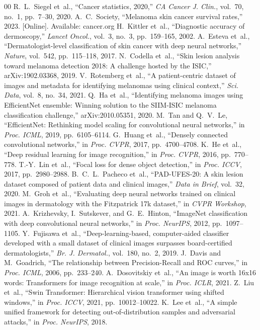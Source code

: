\documentclass[conference]{IEEEtran}
\begin{document}
\begin{thebibliography}{00}
 R.~L.~Siegel et~al., ``Cancer statistics, 2020,'' \textit{CA Cancer J. Clin.}, vol.~70, no.~1, pp.~7--30, 2020.
 A.~C.~Society, ``Melanoma skin cancer survival rates,'' 2023. [Online]. Available: cancer.org
 H.~Kittler et~al., ``Diagnostic accuracy of dermoscopy,'' \textit{Lancet Oncol.}, vol.~3, no.~3, pp.~159--165, 2002.
 A.~Esteva et~al., ``Dermatologist-level classification of skin cancer with deep neural networks,'' \textit{Nature}, vol.~542, pp.~115--118, 2017.
 N.~Codella et~al., ``Skin lesion analysis toward melanoma detection 2018: A challenge hosted by the ISIC,'' arXiv:1902.03368, 2019.
 V.~Rotemberg et~al., ``A patient-centric dataset of images and metadata for identifying melanomas using clinical context,'' \textit{Sci. Data}, vol.~8, no.~34, 2021.
 Q.~Ha et~al., ``Identifying melanoma images using EfficientNet ensemble: Winning solution to the SIIM-ISIC melanoma classification challenge,'' arXiv:2010.05351, 2020.
 M.~Tan and Q.~V.~Le, ``EfficientNet: Rethinking model scaling for convolutional neural networks,'' in \textit{Proc. ICML}, 2019, pp.~6105--6114.
 G.~Huang et~al., ``Densely connected convolutional networks,'' in \textit{Proc. CVPR}, 2017, pp.~4700--4708.
 K.~He et~al., ``Deep residual learning for image recognition,'' in \textit{Proc. CVPR}, 2016, pp.~770--778.
 T.-Y.~Lin et~al., ``Focal loss for dense object detection,'' in \textit{Proc. ICCV}, 2017, pp.~2980--2988.
 B.~C.~L.~Pacheco et~al., ``PAD-UFES-20: A skin lesion dataset composed of patient data and clinical images,'' \textit{Data in Brief}, vol.~32, 2020.
 M.~Groh et~al., ``Evaluating deep neural networks trained on clinical images in dermatology with the Fitzpatrick 17k dataset,'' in \textit{CVPR Workshop}, 2021.
 A.~Krizhevsky, I.~Sutskever, and G.~E.~Hinton, ``ImageNet classification with deep convolutional neural networks,'' in \textit{Proc. NeurIPS}, 2012, pp.~1097--1105.
 Y.~Fujisawa et~al., ``Deep-learning-based, computer-aided classifier developed with a small dataset of clinical images surpasses board-certified dermatologists,'' \textit{Br. J. Dermatol.}, vol.~180, no.~2, 2019.
 J.~Davis and M.~Goadrich, ``The relationship between Precision-Recall and ROC curves,'' in \textit{Proc. ICML}, 2006, pp.~233--240.
 A.~Dosovitskiy et~al., ``An image is worth 16x16 words: Transformers for image recognition at scale,'' in \textit{Proc. ICLR}, 2021.
 Z.~Liu et~al., ``Swin Transformer: Hierarchical vision transformer using shifted windows,'' in \textit{Proc. ICCV}, 2021, pp.~10012--10022.
 K.~Lee et~al., ``A simple unified framework for detecting out-of-distribution samples and adversarial attacks,'' in \textit{Proc. NeurIPS}, 2018.
\end{thebibliography}
\end{document}
